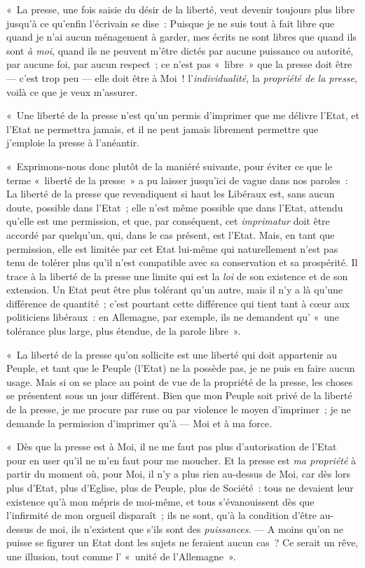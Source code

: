 \documentclass[french,twoside]{book} %
\begin{document}
« La presse, une fois saisie du désir de la liberté, veut devenir toujours plus libre jusqu’à ce qu’enfin l’écrivain se dise : Puisque je ne suis tout à fait libre que quand je n’ai aucun ménagement à garder, mes écrits ne sont libres que quand ils sont \emph{à moi}, quand ils ne peuvent m’être dictés par aucune puissance ou autorité, par aucune foi, par aucun respect ; ce n’est pas « libre » que la presse doit être — c’est trop peu — elle doit être à Moi ! l’\emph{individualité,} la \emph{propriété de la presse}, voilà ce que je veux m’assurer.\par
« Une liberté de la presse n’est qu’un permis d’imprimer que me délivre l’Etat, et l’Etat ne permettra jamais, et il ne peut jamais librement permettre que j’emploie la presse à l’anéantir.\par
« Exprimons-nous donc plutôt de la maniéré suivante, pour éviter ce que le terme « liberté de la presse » a pu laisser jusqu’ici de vague dans nos paroles :  La liberté de la presse que revendiquent si haut les Libéraux est, sans aucun doute, possible dans l’Etat ; elle n’est même possible que dans l’Etat, attendu qu’elle est une permission, et que, par conséquent, cet \emph{imprimatur} doit être accordé par quelqu’un, qui, dans le cas présent, est l’Etat. Mais, en tant que permission, elle est limitée par cet Etat lui-même qui naturellement n’est pas tenu de tolérer plus qu’il n’est compatible avec sa conservation et sa prospérité. Il trace à la liberté de la presse une limite qui est la \emph{loi} de son existence et de son extension. Un Etat peut être plus tolérant qu’un autre, mais il n’y a là qu’une différence de quantité ; c’est pourtant cette différence qui tient tant à cœur aux politiciens libéraux : en Allemagne, par exemple, ils ne demandent qu’ « une tolérance plus large, plus étendue, de la parole libre ».\par
« La liberté de la presse qu’on sollicite est une liberté qui doit appartenir au Peuple, et tant que le Peuple (l’Etat) ne la possède pas, je ne puis en faire aucun usage. Mais si on se place au point de vue de la propriété de la presse, les choses se présentent sous un jour différent. Bien que mon Peuple soit privé de la liberté de la presse, je me procure par ruse ou par violence le moyen d’imprimer ; je ne demande la permission d’imprimer qu’à — Moi et à ma force.\par
« Dès que la presse est à Moi, il ne me faut pas plus d’autorisation de l’Etat pour en user qu’il ne m’en faut pour me moucher. Et la presse est \emph{ma propriété }à partir du moment où, pour Moi, il n’y a plus rien au-dessus de Moi, car dès lors plus d’Etat, plus d’Eglise, plus de Peuple, plus de Société : tous ne devaient leur existence qu’à mon mépris de moi-même, et tous s’évanouissent dès que l’infirmité de mon orgueil disparaît ; ils ne sont, qu’à la condition d’être au-dessus de moi, ils n’existent que s’ils sont des \emph{puissances}. — A moins qu’on ne puisse se figurer un Etat dont les sujets ne feraient aucun cas ? Ce serait  un rêve, une illusion, tout comme l’ « unité de l’Allemagne ».\par
\end{document}
